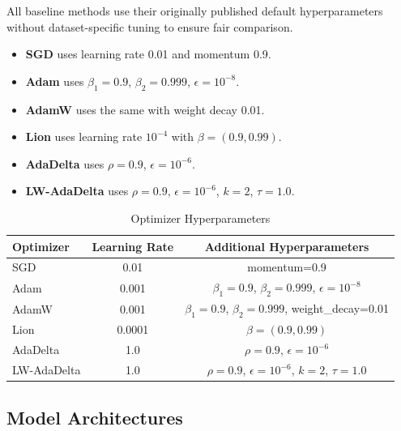 \documentclass[11pt,a4paper]{article}
\begin{document}
All baseline methods use their originally published default hyperparameters without dataset-specific tuning to ensure fair comparison. 
\begin{itemize}
    \item \textbf{SGD} uses learning rate 0.01 and momentum 0.9.
    \item \textbf{Adam} uses $\beta_1=0.9$, $\beta_2=0.999$, $\epsilon=10^{-8}$.
    \item \textbf{AdamW} uses the same with weight decay 0.01.
    \item \textbf{Lion} uses learning rate $10^{-4}$ with $\beta=(0.9, 0.99)$.
    \item \textbf{AdaDelta} uses $\rho=0.9$, $\epsilon=10^{-6}$.
    \item \textbf{LW-AdaDelta} uses $\rho=0.9$, $\epsilon=10^{-6}$, $k=2$, $\tau=1.0$.
\end{itemize}

\begin{table}[H]
\centering
\tiny
\caption{Optimizer Hyperparameters}
\label{tab:optimizers}
\begin{tabular}{lcc}
\toprule
\textbf{Optimizer} & \textbf{Learning Rate} & \textbf{Additional Hyperparameters} \\
\midrule
SGD & 0.01 & momentum=0.9 \\
Adam & 0.001 & $\beta_1=0.9$, $\beta_2=0.999$, $\epsilon=10^{-8}$ \\
AdamW & 0.001 & $\beta_1=0.9$, $\beta_2=0.999$, weight\_decay=0.01 \\
Lion & 0.0001 & $\beta=(0.9, 0.99)$ \\
AdaDelta & 1.0 & $\rho=0.9$, $\epsilon=10^{-6}$ \\
LW-AdaDelta & 1.0 & $\rho=0.9$, $\epsilon=10^{-6}$, $k=2$, $\tau=1.0$ \\
\bottomrule
\end{tabular}
\end{table}

\subsection{Model Architectures}
\end{document}
